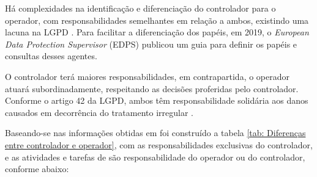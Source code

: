 \documentclass[
	12pt,				%
	openright,			%
	oneside,			%
	a4paper,			%
	english,			%
	french,				%
	spanish,			%
	brazil,				%
	]{abntex2}
\begin{document}
Há complexidades na identificação e diferenciação do controlador para o operador, com responsabilidades semelhantes em relação a ambos, existindo uma lacuna na LGPD \cite{Alves2020}. Para facilitar a diferenciação dos papéis, em 2019, o \textit{European Data Protection Supervisor} (EDPS) publicou um guia para definir os papéis e consultas desses agentes. 

O controlador terá maiores responsabilidades, em contrapartida, o operador atuará subordinadamente, respeitando as decisões proferidas pelo controlador. Conforme o artigo 42 da LGPD, ambos têm responsabilidade solidária aos danos causados em decorrência do tratamento irregular \cite{01-01-LeiGeral}. 

Baseando-se nas informações obtidas em \cite{Alves2020}  foi construído a tabela \ref{tab: Diferenças entre controlador e operador}, com as responsabilidades exclusivas do controlador, e as atividades e tarefas de são responsabilidade do operador ou do controlador, conforme abaixo:
\end{document}
